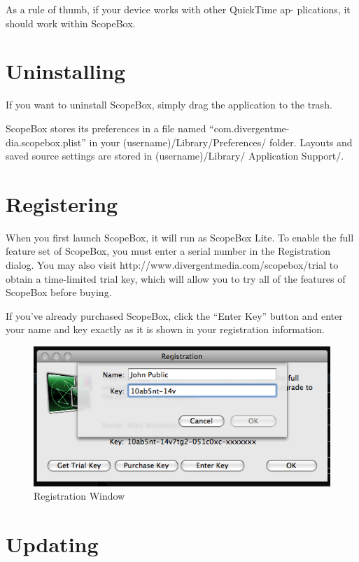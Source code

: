 \documentclass[10,letterpaper,]{report}
\begin{document}
As a rule of thumb, if your device works with other QuickTime ap-
plications, it should work within ScopeBox.

\section{Uninstalling}

If you want to uninstall ScopeBox, simply drag the application to the
trash.

ScopeBox stores its preferences in a file named ``com.divergentme-
dia.scopebox.plist'' in your (username)/Library/Preferences/ folder.
Layouts and saved source settings are stored in (username)/Library/
Application Support/.

\section{Registering}

When you first launch ScopeBox, it will run as ScopeBox Lite. To enable
the full feature set of ScopeBox, you must enter a serial number in the
Registration dialog. You may also visit
http://www.divergentmedia.com/scopebox/trial to obtain a time-limited
trial key, which will allow you to try all of the features of ScopeBox
before buying.

If you've already purchased ScopeBox, click the ``Enter Key'' button and
enter your name and key exactly as it is shown in your registration
information.

\begin{figure}[htbp]
\centering
\includegraphics{images/registration.png}
\caption{Registration Window}
\end{figure}

\section{Updating}
\end{document}
